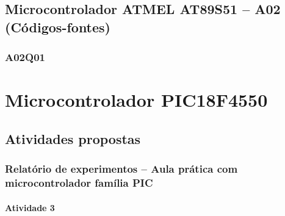 \documentclass[
	12pt,				%
	openright,			%
  oneside,     %
	a4paper,			%
	english,			%
	french,				%
	spanish,			%
	brazil				%
	]{abntex2}
\begin{document}
\section*{Microcontrolador ATMEL AT89S51 -- A02 (Códigos-fontes)}
\subsection*{A02Q01}



%
%

\chapter{Microcontrolador PIC18F4550}%
\label{cha:3-PIC}

\section{Atividades propostas} %
\label{cha:PIC-sec:atividades_propostas}

\subsection*{Relatório de experimentos – Aula prática com microcontrolador família PIC}

\subsubsection*{Atividade 3}
\end{document}
